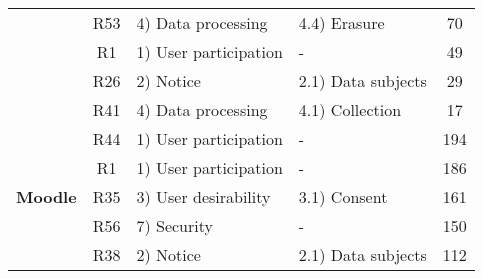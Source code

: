 \begin{table}[ht]
{\begin{tabular}{@{}ccllc@{}}
		& R53                  & 4) Data processing                    & 4.4) Erasure                                                           & 70                                                                         \\
		& R1                   & 1) User participation                 & -                                                                      & 49                                                                         \\
		& R26                  & 2) Notice                             & 2.1) Data subjects                                                     & 29                                                                         \\
		& R41                  & 4) Data processing                    & 4.1) Collection                                                        & 17                                                                         \\ \midrule
		\multicolumn{1}{l}{\multirow{10}{*}{\textbf{Moodle}}} & R44                  & 1) User participation                 & -                                                                      & 194                                                                        \\
		\multicolumn{1}{l}{}                                  & R1                   & 1) User participation                 & -                                                                      & 186                                                                        \\
		\multicolumn{1}{l}{}                                  & R35                  & 3) User desirability                  & 3.1) Consent                                                           & 161                                                                        \\
		\multicolumn{1}{l}{}                                  & R56                  & 7) Security                           &  -                                                                      & 150                                                                        \\
		\multicolumn{1}{l}{}                                  & R38                  & 2) Notice                             & 2.1) Data subjects                                                     & 112                                                                        \\

\end{tabular}}
\end{table}
